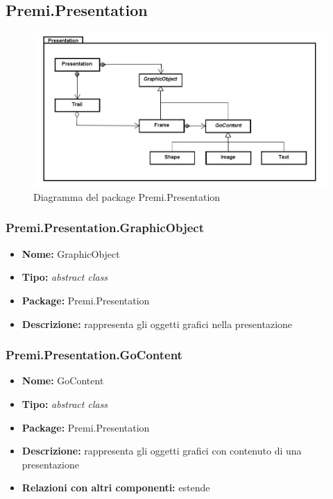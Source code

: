 \clearpage
\subsection{Premi.Presentation}
\begin{figure}[h]
\begin{center}
\includegraphics[scale=0.45]{img/diapkg/vecchi/presentation-class.jpg}
\caption{Diagramma del package Premi.Presentation}
\end{center}
\end{figure}
\subsubsection{Premi.Presentation.GraphicObject}
\begin{itemize}
  \item \textbf{Nome:} GraphicObject
  \item \textbf{Tipo:} \textit{abstract class}
  \item \textbf{Package:} Premi.Presentation
  \item \textbf{Descrizione:} rappresenta gli oggetti grafici nella presentazione
\end{itemize}
\subsubsection{Premi.Presentation.GoContent}
\begin{itemize}
  \item \textbf{Nome:} GoContent
  \item \textbf{Tipo:} \textit{abstract class}
  \item \textbf{Package:} Premi.Presentation
  \item \textbf{Descrizione:} rappresenta gli oggetti grafici con contenuto di una presentazione
  \item \textbf{Relazioni con altri componenti:} estende 
\end{itemize}
